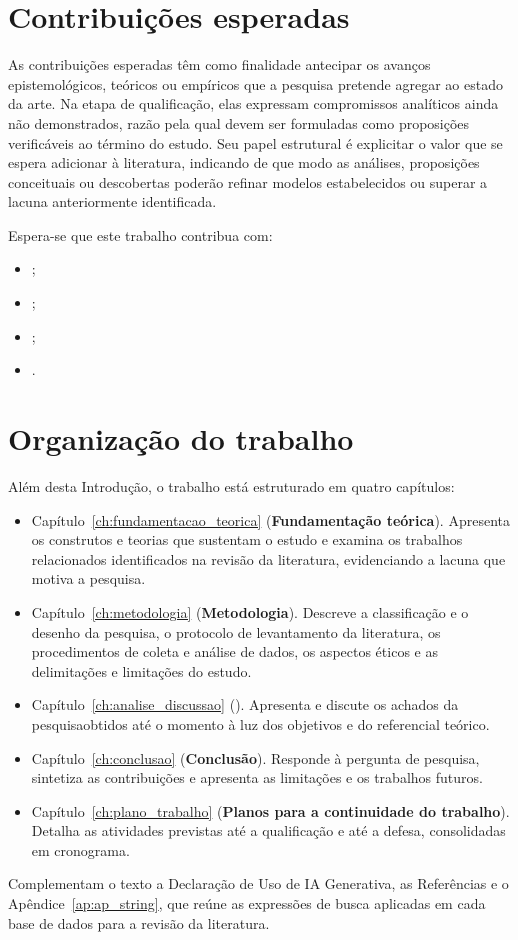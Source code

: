 \section{Contribuições esperadas}
\label{sec:contribuicoes}
As contribuições esperadas têm como finalidade antecipar os avanços epistemológicos, teóricos ou empíricos que a pesquisa pretende agregar ao estado da arte. Na etapa de qualificação, elas expressam compromissos analíticos ainda não demonstrados, razão pela qual devem ser formuladas como proposições verificáveis ao término do estudo. Seu papel estrutural é explicitar o valor que se espera adicionar à literatura, indicando de que modo as análises, proposições conceituais ou descobertas poderão refinar modelos estabelecidos ou superar a lacuna anteriormente identificada.

Espera-se que este trabalho contribua com:

\begin{itemize}
  \item {};
  \item {};
  \item {};
  \item {}.
\end{itemize}

\section{Organização do trabalho}
\label{sec:organizacao}
Além desta Introdução, o trabalho está estruturado em quatro capítulos:

\begin{itemize}
  \item Capítulo~\ref{ch:fundamentacao_teorica} (\textbf{Fundamentação teórica}). Apresenta os construtos e teorias que sustentam o estudo e examina os trabalhos relacionados identificados na revisão da literatura, evidenciando a lacuna que motiva a pesquisa.
  \item Capítulo~\ref{ch:metodologia} (\textbf{Metodologia}). Descreve a classificação e o desenho da pesquisa, o protocolo de levantamento da literatura, os procedimentos de coleta e análise de dados, os aspectos éticos e as delimitações e limitações do estudo.
  \item Capítulo~\ref{ch:analise_discussao} (\textbf{\titresultados}). Apresenta e discute os achados \ifdefesa da pesquisa\else obtidos até o momento\fi{} à luz dos objetivos e do referencial teórico.
        \ifdefesa
  \item Capítulo~\ref{ch:conclusao} (\textbf{Conclusão}). Responde à pergunta de pesquisa, sintetiza as contribuições e apresenta as limitações e os trabalhos futuros.
        \else
  \item Capítulo~\ref{ch:plano_trabalho} (\textbf{Planos para a continuidade do trabalho}). Detalha as atividades previstas até a qualificação e até a defesa, consolidadas em cronograma.
        \fi
\end{itemize}

Complementam o texto a Declaração de Uso de IA Generativa, as Referências e o Apêndice~\ref{ap:ap_string}, que reúne as expressões de busca aplicadas em cada base de dados para a revisão da literatura.
